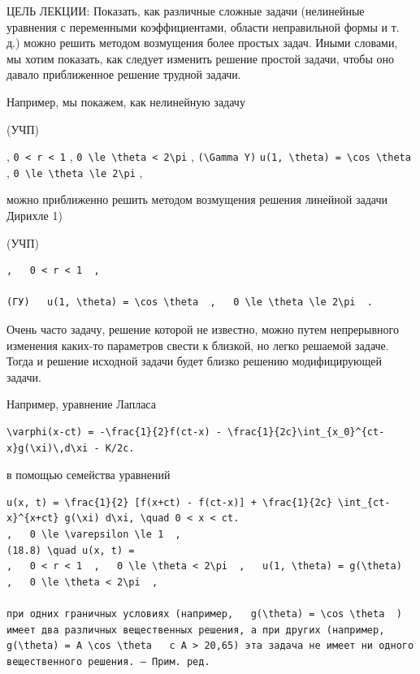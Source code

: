 \documentclass[
  ukrainian,
]{article}
\begin{document}
ЦЕЛЬ ЛЕКЦИИ: Показать, как различные сложные задачи (нелинейные
уравнения с переменными коэффициентами, области неправильной формы и т.
д.) можно решить методом возмущения более простых задач. Иными словами,
мы хотим показать, как следует изменить решение простой задачи, чтобы
оно давало приближенное решение трудной задачи.

Например, мы покажем, как нелинейную задачу

(УЧП)

, \texttt{0\ \textless{}\ r\ \textless{}\ 1} ,
\texttt{0\ \textbackslash{}le\ \textbackslash{}theta\ \textless{}\ 2\textbackslash{}pi}
, \texttt{(\textbackslash{}Gamma\ Y)}
\texttt{u(1,\ \textbackslash{}theta)\ =\ \textbackslash{}cos\ \textbackslash{}theta}
,
\texttt{0\ \textbackslash{}le\ \textbackslash{}theta\ \textbackslash{}le\ 2\textbackslash{}pi}
,

можно приближенно решить методом возмущения решения линейной задачи
Дирихле 1)

(УЧП)

\begin{verbatim}
,   0 < r < 1  ,

(ГУ)   u(1, \theta) = \cos \theta  ,   0 \le \theta \le 2\pi  .
\end{verbatim}

Очень часто задачу, решение которой не известно, можно путем
непрерывного изменения каких-то параметров свести к близкой, но легко
решаемой задаче. Тогда и решение исходной задачи будет близко решению
модифицирующей задачи.

Например, уравнение Лапласа

\begin{verbatim}
\varphi(x-ct) = -\frac{1}{2}f(ct-x) - \frac{1}{2c}\int_{x_0}^{ct-x}g(\xi)\,d\xi - K/2c.
\end{verbatim}

в помощью семейства уравнений

\begin{verbatim}
u(x, t) = \frac{1}{2} [f(x+ct) - f(ct-x)] + \frac{1}{2c} \int_{ct-x}^{x+ct} g(\xi) d\xi, \quad 0 < x < ct.
,   0 \le \varepsilon \le 1  ,
(18.8) \quad u(x, t) =
,   0 < r < 1  ,   0 \le \theta < 2\pi  ,   u(1, \theta) = g(\theta)  ,   0 \le \theta < 2\pi  ,

при одних граничных условиях (например,   g(\theta) = \cos \theta  ) имеет два различных вещественных решения, а при других (например,   g(\theta) = A \cos \theta   с A > 20,65) эта задача не имеет ни одного вещественного решения. — Прим. ред.
\end{verbatim}
\end{document}

